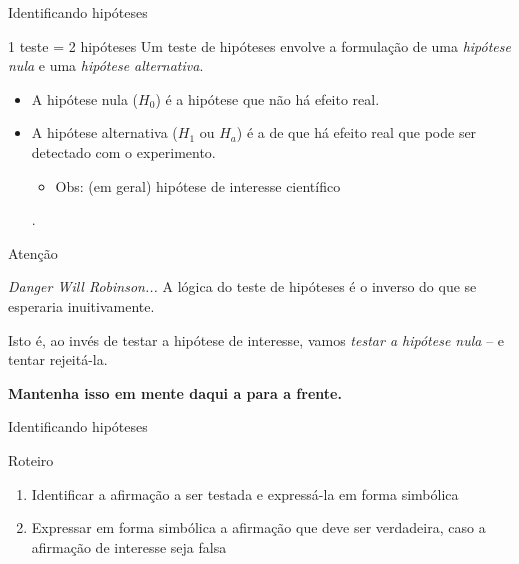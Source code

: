 \documentclass{beamer}
\begin{document}
\begin{frame}{Identificando hipóteses}
  \begin{block}{1 teste = 2 hipóteses}
    Um teste de hipóteses envolve a formulação de uma {\em hipótese nula} e uma {\em hipótese alternativa}.
  \end{block}
  \begin{itemize}
    \small
    \bigskip
  \item A hipótese nula ($H_0$) é a hipótese que não há efeito real.
    \bigskip
  \item A hipótese alternativa ($H_1$ ou $H_a$) é a de que há efeito real \alert{que pode ser detectado} com o experimento.
    \begin{itemize}
    \item Obs: (em geral) hipótese de interesse científico
    \end{itemize}
.
  \end{itemize}
\end{frame}

\begin{frame}{Atenção}
  \begin{block}{{\em Danger Will Robinson...}}
    A lógica do teste de hipóteses é o \alert{inverso} do que se esperaria inuitivamente.

    \bigskip
    Isto é, ao invés de testar a hipótese de interesse, vamos {\em testar a hipótese nula} -- e tentar rejeitá-la.
  \end{block}

  \hfill
  \begin{center}
    {\bf Mantenha isso em mente daqui a para a frente.}
  \end{center}
\end{frame}

\begin{frame}{Identificando hipóteses}
  \begin{block}{Roteiro}
    \begin{enumerate}
    \item Identificar a afirmação a ser testada e expressá-la em forma simbólica
    \item Expressar em forma simbólica a afirmação que deve ser
      verdadeira, caso a afirmação de interesse seja falsa
    \end{enumerate}
  \end{block}
\end{frame}
\end{document}
